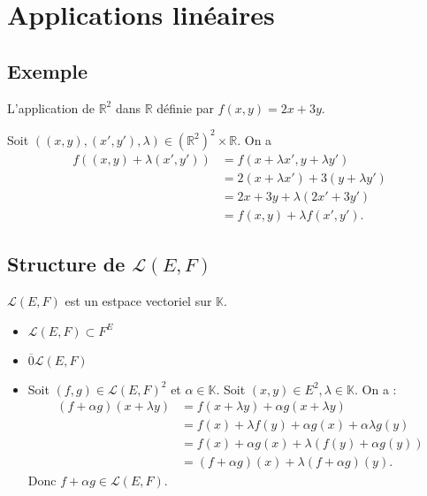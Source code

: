 \documentclass[../main.tex]{subfiles}
\begin{document}
\setcounter{chapter}{20}
\chapter{Applications linéaires}
\tableofcontents
\clearpage

\section{Exemple}
\begin{tcolorbox}[title=Exemple 21.4.1, title filled=false, colframe=darkgreen, colback=darkgreen!10!white]
    L'application de $\mathbb{R}^2$ dans $\mathbb{R}$ définie par $f(x, y) = 2x + 3y$. 
\end{tcolorbox}

\noindent Soit $((x, y), (x', y'), \lambda) \in (\mathbb{R}^2)^2 \times \mathbb{R}$. On a
\begin{align*}
    f((x, y) + \lambda (x', y')) &= f(x + \lambda x', y + \lambda y') \\
    &= 2(x + \lambda x') + 3(y + \lambda y') \\
    &= 2x + 3y + \lambda(2x' + 3y') \\
    &= f(x, y) + \lambda f(x', y').
\end{align*}

\section{Structure de $\mathcal{L}(E, F)$}
\begin{tcolorbox}[title=Propostion 21.8, title filled=false, colframe=lightblue, colback=lightblue!10!white]
    $\mathcal{L}(E, F)$ est un estpace vectoriel sur $\mathbb{K}$.
\end{tcolorbox}

\noindent \begin{itemize}
    \item $\mathcal{L}(E, F) \subset F^E$
    \item $\overline{0} \mathcal{L}(E, F)$
    \item Soit $(f, g) \in \mathcal{L}(E, F)^2$ et $\alpha \in \mathbb{K}$. Soit $(x, y) \in E^2, \lambda \in \mathbb{K}$. On a : 
    \begin{align*}
        (f + \alpha g)(x + \lambda y) &= f(x + \lambda y) + \alpha g(x + \lambda y) \\
        &= f(x) + \lambda f(y) + \alpha g(x) + \alpha \lambda g(y) \\
        &= f(x) + \alpha g(x) + \lambda (f(y) + \alpha g(y)) \\
        &= (f + \alpha g)(x) + \lambda (f + \alpha g)(y).
    \end{align*}
    Donc $f + \alpha g \in \mathcal{L}(E, F)$.
\end{itemize}
\end{document}
